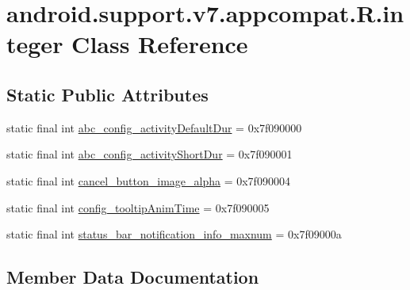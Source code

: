 \hypertarget{classandroid_1_1support_1_1v7_1_1appcompat_1_1R_1_1integer}{}\section{android.\+support.\+v7.\+appcompat.\+R.\+integer Class Reference}
\label{classandroid_1_1support_1_1v7_1_1appcompat_1_1R_1_1integer}
\subsection*{Static Public Attributes}
\begin{DoxyCompactItemize}
\item 
static final int \mbox{\hyperlink{classandroid_1_1support_1_1v7_1_1appcompat_1_1R_1_1integer_a4fb2e7826a35c40f397f9f14b86a0c7d}{abc\+\_\+config\+\_\+activity\+Default\+Dur}} = 0x7f090000
\item 
static final int \mbox{\hyperlink{classandroid_1_1support_1_1v7_1_1appcompat_1_1R_1_1integer_a6687bb8055a5a731b1429884734c9565}{abc\+\_\+config\+\_\+activity\+Short\+Dur}} = 0x7f090001
\item 
static final int \mbox{\hyperlink{classandroid_1_1support_1_1v7_1_1appcompat_1_1R_1_1integer_a21ede1655715ffc1421fbd057706bfa8}{cancel\+\_\+button\+\_\+image\+\_\+alpha}} = 0x7f090004
\item 
static final int \mbox{\hyperlink{classandroid_1_1support_1_1v7_1_1appcompat_1_1R_1_1integer_a50de93cd4384999ae960f3cf2f8decb9}{config\+\_\+tooltip\+Anim\+Time}} = 0x7f090005
\item 
static final int \mbox{\hyperlink{classandroid_1_1support_1_1v7_1_1appcompat_1_1R_1_1integer_a52a3923b3d9ba3b58e218794b30683dc}{status\+\_\+bar\+\_\+notification\+\_\+info\+\_\+maxnum}} = 0x7f09000a
\end{DoxyCompactItemize}


\subsection{Member Data Documentation}
\mbox{\label{classandroid_1_1support_1_1v7_1_1appcompat_1_1R_1_1integer_a4fb2e7826a35c40f397f9f14b86a0c7d}} 
